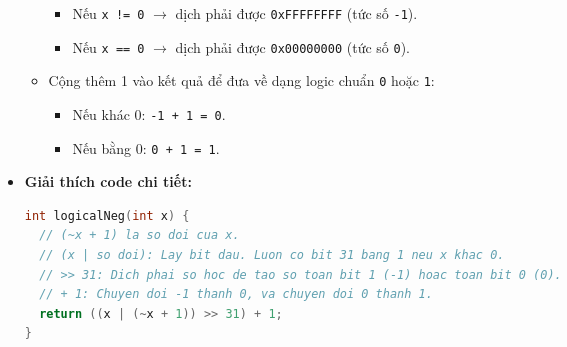 \documentclass[12pt, a4paper]{article}
\begin{document}
\begin{itemize}
\begin{itemize}
\begin{itemize}
            \item Nếu \texttt{x != 0} $\rightarrow$ dịch phải được \texttt{0xFFFFFFFF} (tức số \texttt{-1}).
            \item Nếu \texttt{x == 0} $\rightarrow$ dịch phải được \texttt{0x00000000} (tức số \texttt{0}).
        \end{itemize}
        \item Cộng thêm 1 vào kết quả để đưa về dạng logic chuẩn \texttt{0} hoặc \texttt{1}:
        \begin{itemize}
            \item Nếu khác 0: \texttt{-1 + 1 = 0}.
            \item Nếu bằng 0: \texttt{0 + 1 = 1}.
        \end{itemize}
    \end{itemize}
    \item \textbf{Giải thích code chi tiết:}


\begin{minipage}{\linewidth}
\begin{lstlisting}[language=C]
int logicalNeg(int x) {
  // (~x + 1) la so doi cua x.
  // (x | so doi): Lay bit dau. Luon co bit 31 bang 1 neu x khac 0.
  // >> 31: Dich phai so hoc de tao so toan bit 1 (-1) hoac toan bit 0 (0).
  // + 1: Chuyen doi -1 thanh 0, va chuyen doi 0 thanh 1.
  return ((x | (~x + 1)) >> 31) + 1;
}
\end{lstlisting}
\end{minipage}
\end{itemize}

\newpage
\end{document}
